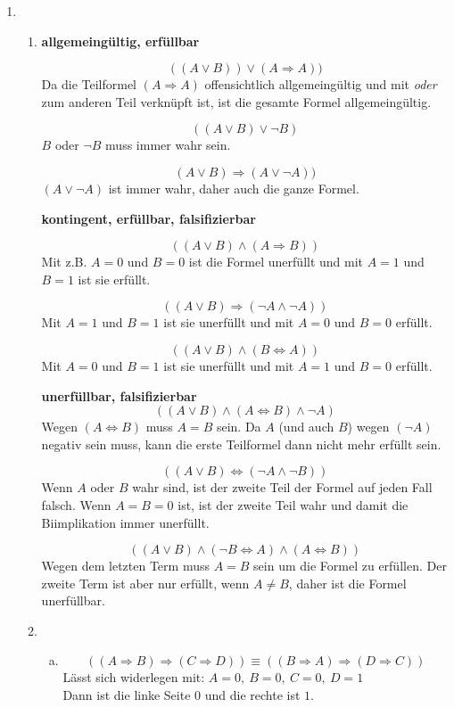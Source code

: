 \documentclass[a4paper,10pt]{scrartcl}
\title{\titleinfo}
\author{Arne Feil}
\date{\today}
\newcommand{\aufgabe}[1]{\item[\textbf{#1}]}
\begin{document}
\begin{enumerate}

\aufgabe{6.3}
\begin{enumerate}[1.]
 \item

  \textbf{allgemeingültig, erfüllbar}

  $$((A\vee B))\vee (A\Rightarrow A))$$
  Da die Teilformel $(A\Rightarrow A)$ offensichtlich allgemeingültig und mit \textit{oder} zum anderen Teil verknüpft ist, ist die gesamte Formel allgemeingültig.

  $$((A\vee B)\vee\neg B)$$
  $B$ oder $\neg B$ muss immer wahr sein.

  $$(A\vee B)\Rightarrow(A\vee\neg A))$$
  $(A\vee\neg A)$ ist immer wahr, daher auch die ganze Formel.

  \textbf{kontingent, erfüllbar, falsifizierbar}

  $$((A\vee B)\wedge(A\Rightarrow B))$$
  Mit z.B. $A=0$ und $B=0$ ist die Formel unerfüllt und mit $A=1$ und $B=1$ ist sie erfüllt.

  $$((A\vee B)\Rightarrow(\neg A\wedge \neg A))$$
  Mit $A=1$ und $B=1$ ist sie unerfüllt und mit $A=0$ und $B=0$ erfüllt.

  $$((A\vee B)\wedge(B\Leftrightarrow A))$$
  Mit $A=0$ und $B=1$ ist sie unerfüllt und mit $A=1$ und $B=0$ erfüllt.

  \textbf{unerfüllbar, falsifizierbar}
  $$((A\vee B)\wedge(A\Leftrightarrow B)\wedge\neg A)$$
  Wegen $(A\Leftrightarrow B)$ muss $A=B$ sein. Da $A$ (und auch $B$) wegen $(\neg A)$ negativ sein muss, kann die erste Teilformel dann nicht mehr erfüllt sein.

  $$((A\vee B)\Leftrightarrow(\neg A\wedge\neg B))$$
  Wenn $A$ oder $B$ wahr sind, ist der zweite Teil der Formel auf jeden Fall falsch. Wenn $A=B=0$ ist, ist der zweite Teil wahr und damit die Biimplikation immer unerfüllt.

  $$((A\vee B)\wedge(\neg B\Leftrightarrow A)\wedge(A\Leftrightarrow B))$$
  Wegen dem letzten Term muss $A=B$ sein um die Formel zu erfüllen. Der zweite Term ist aber nur erfüllt, wenn $A\neq B$, daher ist die Formel unerfüllbar.

  \item

  \begin{enumerate}[a)]
   \item
   $$((A\Rightarrow B)\Rightarrow(C\Rightarrow D))\equiv ((B\Rightarrow A)\Rightarrow(D\Rightarrow C))$$
   Lässt sich widerlegen mit: $A=0,\ B=0,\ C=0,\ D=1$\\
   Dann ist die linke Seite $0$ und die rechte ist $1$.


\end{enumerate}
\end{enumerate}
\end{enumerate}
\end{document}

